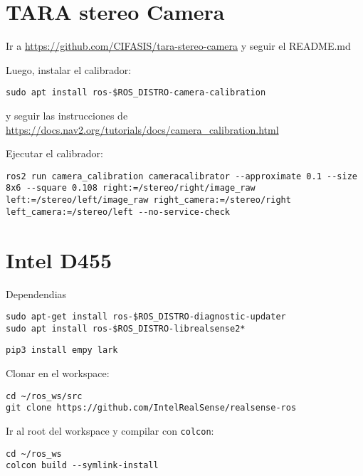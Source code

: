 \documentclass[apunte]{lcc}
\begin{document}
\maketitle

\section{TARA stereo Camera}

Ir a \url{https://github.com/CIFASIS/tara-stereo-camera} y seguir el README.md

Luego, instalar el calibrador:

\begin{lstlisting}[style=bash]
sudo apt install ros-$ROS_DISTRO-camera-calibration
\end{lstlisting}

y seguir las instrucciones de \url{https://docs.nav2.org/tutorials/docs/camera_calibration.html}

Ejecutar el calibrador:

\begin{lstlisting}[style=bash]
ros2 run camera_calibration cameracalibrator --approximate 0.1 --size 8x6 --square 0.108 right:=/stereo/right/image_raw left:=/stereo/left/image_raw right_camera:=/stereo/right left_camera:=/stereo/left --no-service-check
\end{lstlisting}


\section{Intel D455}

Dependendias
\begin{lstlisting}[style=bash]
sudo apt-get install ros-$ROS_DISTRO-diagnostic-updater
sudo apt install ros-$ROS_DISTRO-librealsense2*
\end{lstlisting}

\begin{lstlisting}[style=bash]
pip3 install empy lark
\end{lstlisting}

Clonar en el workspace:
\begin{lstlisting}[style=bash]
cd ~/ros_ws/src
git clone https://github.com/IntelRealSense/realsense-ros
\end{lstlisting}

Ir al root del workspace y compilar con \lstinline{colcon}:
\begin{lstlisting}[style=bash]
cd ~/ros_ws
colcon build --symlink-install
\end{lstlisting}
\end{document}
